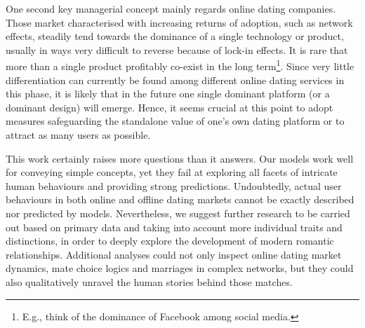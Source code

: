 One second key managerial concept mainly regards online dating companies.
Those market characterised with increasing returns of adoption, such
as network effects, steadily tend towards the dominance of a single
technology or product, usually in ways very difficult to reverse because
of lock-in effects. It is rare that more than a single product profitably
co-exist in the long term\footnote{E.g., think of the dominance of Facebook among social media.}.
Since very little differentiation can currently be found among different
online dating services in this phase, it is likely that in the future
one single dominant platform (or a dominant design) will emerge. Hence,
it seems crucial at this point to adopt measures safeguarding the
standalone value of one's own dating platform \textendash{} or to
attract as many users as possible. 

This work certainly raises more questions than it answers. Our models
work well for conveying simple concepts, yet they fail at exploring
all facets of intricate human behaviours and providing strong predictions.
Undoubtedly, actual user behaviours in both online and offline dating
markets cannot be exactly described nor predicted by models. Nevertheless,
we suggest further research to be carried out based on primary data
and taking into account more individual traits and distinctions, in
order to deeply explore the development of modern romantic relationships.
Additional analyses could not only inspect online dating market dynamics,
mate choice logics and marriages in complex networks, but they could
also qualitatively unravel the human stories behind those matches. 


